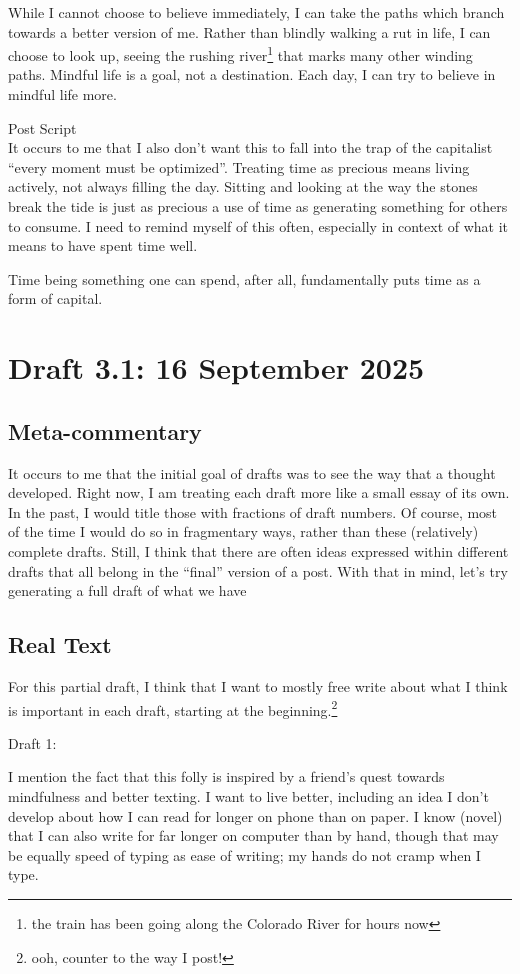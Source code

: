 \documentclass[12pt]{article}
\newcommand{\say}[1]{``#1''}
\renewcommand{\,}{\textsuperscript{,}}
\begin{document}
While I cannot choose to believe immediately, I can take the paths which branch towards a better version of me.
Rather than blindly walking a rut in life, I can choose to look up, seeing the rushing river\footnote{the train has been going along the Colorado River for hours now} that marks many other winding paths.
Mindful life is a goal, not a destination.
Each day, I can try to believe in mindful life more.

Post Script\\
It occurs to me that I also don't want this to fall into the trap of the capitalist \say{every moment must be optimized}.
Treating time as precious means living actively, not always filling the day.
Sitting and looking at the way the stones break the tide is just as precious a use of time as generating something for others to consume.
I need to remind myself of this often, especially in context of what it means to have spent time well.

Time being something one can spend, after all, fundamentally puts time as a form of capital.

\section{Draft 3.1: 16 September 2025}
\subsection{Meta-commentary}
It occurs to me that the initial goal of drafts was to see the way that a thought developed.
Right now, I am treating each draft more like a small essay of its own.
In the past, I would title those with fractions of draft numbers.
Of course, most of the time I would do so in fragmentary ways, rather than these (relatively) complete drafts.
Still, I think that there are often ideas expressed within different drafts that all belong in the \say{final} version of a post.
With that in mind, let's try generating a full draft of what we have
\subsection{Real Text}
For this partial draft, I think that I want to mostly free write about what I think is important in each draft, starting at the beginning.\footnote{ooh, counter to the way I post!}

Draft 1:

I mention the fact that this folly is inspired by a friend's quest towards mindfulness and better texting.
I want to live better, including an idea I don't develop about how I can read for longer on phone than on paper.
I know (novel) that I can also write for far longer on computer than by hand, though that may be equally speed of typing as ease of writing; my hands do not cramp when I type.
\end{document}
